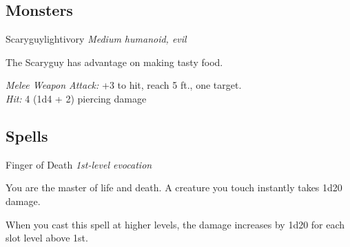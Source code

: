 \documentclass[10pt,twoside,twocolumn]{article}
\begin{document}
\newpage %

\subsection{Monsters}
\begin{monsterbox}{Scaryguy}{}{lightivory}
    \textit{Medium humanoid, evil} \\
    \basics[armorclass=12, hitpoints=16 (3d8+3), speed=50 ft]
    \stats[STR = 12 (+1), DEX = 14 (+2), CON = 13 (+1), 
           INT = 8 (-1),  WIS = 10 (+0), CHA = 7 (-2)]
    
    \details[ %
        skills = Perception +2,
        savingthrows = Dex +4,
        languages = {Common, Abyssal},
        challenge = 1/2 (100 xp)
    ]
    
    \begin{monsteraction}
        The Scaryguy has advantage on making tasty food.
    \end{monsteraction}

    \begin{monsteraction}[Shortsword]
        \textit{Melee Weapon Attack:} +3 to hit, reach 5 ft., one target.\\
        \textit{Hit:} 4 (1d4 + 2) piercing damage
    \end{monsteraction}
\end{monsterbox}

\subsection{Spells}
\begin{spellbox}{Finger of Death}
    \textit{1st-level evocation}\\
    \requirements[ %
        castingtime=1 action,
        range=Touch,
        components={V, S},
        duration=Instantaneous
    ]
    
    You are the master of life and death. A creature you touch instantly
    takes 1d20 damage.

    \begin{spellaction}
        When you cast this spell at higher levels, the damage increases by
        1d20 for each slot level above 1st.
    \end{spellaction}
\end{spellbox}

\end{document}
